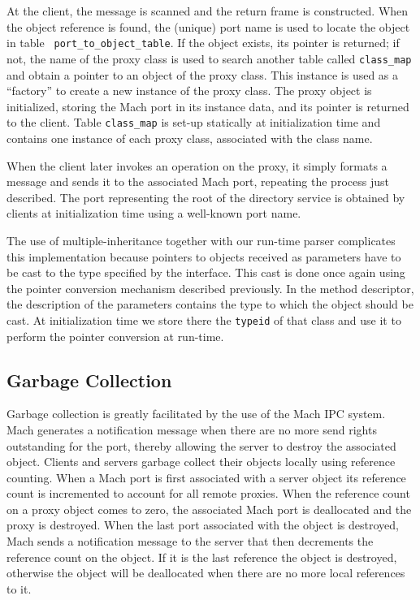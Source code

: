 At the client, the message is scanned and the return frame is
constructed. When the object reference is found, the (unique) port
name is used to locate the object in table {\tt
port\_to\_object\_table}. If the object exists, its 
pointer is returned; if not, the name of the proxy class is used to
search another table called {\tt class\_map} and obtain a pointer to
an object of the proxy class. This instance is used as a ``factory''
to create a new instance of the proxy class. The proxy object is
initialized, storing the Mach port in its instance data, and its
pointer is returned to the client. Table {\tt class\_map} is set-up
statically at initialization time and contains one instance of each
proxy class, associated with the class name.

When the client later invokes an operation on the proxy, it
simply formats a message and sends it to the
associated Mach port, repeating the process just described.
The port representing the root of the directory service is obtained by
clients at initialization time using a well-known port name.

The use of multiple-inheritance together with our run-time parser
complicates this implementation because pointers to objects received
as parameters have to be cast to the type specified by the interface.
This cast is done once again using the pointer conversion mechanism described
previously. In the method descriptor, the description of the
parameters contains the type to which the object should be cast. At
initialization time we store there the {\tt typeid} of that class and
use it to perform the pointer conversion at run-time.

\subsection{Garbage Collection}

Garbage collection is greatly facilitated by the use of the Mach
IPC system.
Mach generates a notification message when there are no more send
rights outstanding for the port, thereby allowing the server to destroy the
associated object. Clients and servers garbage collect their objects
locally using reference counting. When a Mach port is first associated
with a server object its reference count is incremented to account for
all remote proxies. When the reference count on a proxy object comes
to zero, the associated Mach port is deallocated and the proxy is
destroyed. When the last port associated with the object is
destroyed, Mach sends a notification message to the server that
then decrements the reference count on the object. If it is the
last reference the object is destroyed, otherwise the object will be
deallocated when there are no more local references to it.

